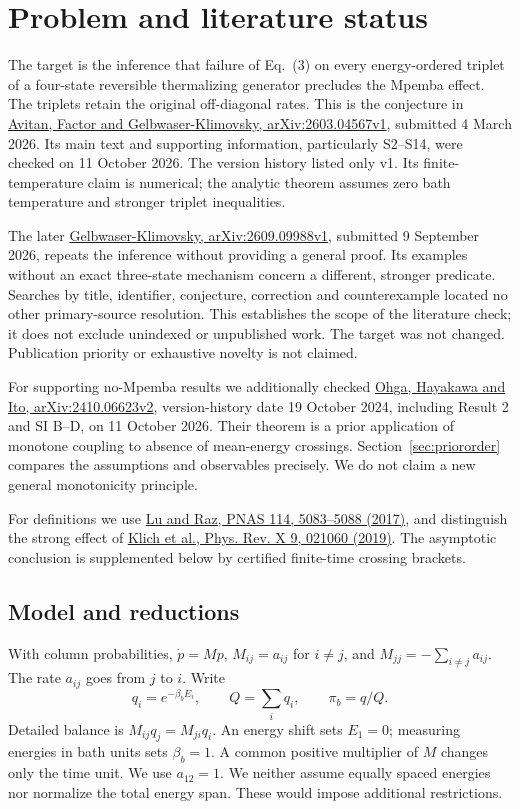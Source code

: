 \documentclass[11pt]{article}
\begin{document}
\section{Problem and literature status}
The target is the inference that failure of Eq.~(3) on every energy-ordered triplet of a four-state reversible thermalizing generator precludes the Mpemba effect. The triplets retain the original off-diagonal rates. This is the conjecture in \href{https://arxiv.org/html/2603.04567v1}{Avitan, Factor and Gelbwaser-Klimovsky, arXiv:2603.04567v1}, submitted 4 March 2026. Its main text and supporting information, particularly S2--S14, were checked on 11 October 2026. The version history listed only v1. Its finite-temperature claim is numerical; the analytic theorem assumes zero bath temperature and stronger triplet inequalities.

The later \href{https://arxiv.org/html/2609.09988v1}{Gelbwaser-Klimovsky, arXiv:2609.09988v1}, submitted 9 September 2026, repeats the inference without providing a general proof. Its examples without an exact three-state mechanism concern a different, stronger predicate. Searches by title, identifier, conjecture, correction and counterexample located no other primary-source resolution. This establishes the scope of the literature check; it does not exclude unindexed or unpublished work. The target was not changed. Publication priority or exhaustive novelty is not claimed.

For supporting no-Mpemba results we additionally checked \href{https://arxiv.org/html/2410.06623v2}{Ohga, Hayakawa and Ito, arXiv:2410.06623v2}, version-history date 19 October 2024, including Result 2 and SI B--D, on 11 October 2026. Their theorem is a prior application of monotone coupling to absence of mean-energy crossings. Section~\ref{sec:priororder} compares the assumptions and observables precisely. We do not claim a new general monotonicity principle.

For definitions we use \href{https://pmc.ncbi.nlm.nih.gov/articles/PMC5441807/}{Lu and Raz, PNAS 114, 5083--5088 (2017)}, and distinguish the strong effect of \href{https://arxiv.org/abs/1711.05829}{Klich et al., Phys. Rev. X 9, 021060 (2019)}. The asymptotic conclusion is supplemented below by certified finite-time crossing brackets.

\subsection{Model and reductions}
With column probabilities, $\dot p=Mp$, $M_{ij}=a_{ij}$ for $i\ne j$, and $M_{jj}=-\sum_{i\ne j}a_{ij}$. The rate $a_{ij}$ goes from $j$ to $i$. Write
\[
q_i=e^{-\beta_b E_i},\qquad Q=\sum_iq_i,\qquad \pi_b=q/Q.
\]
Detailed balance is $M_{ij}q_j=M_{ji}q_i$. An energy shift sets $E_1=0$; measuring energies in bath units sets $\beta_b=1$. A common positive multiplier of $M$ changes only the time unit. We use $a_{12}=1$. We neither assume equally spaced energies nor normalize the total energy span. These would impose additional restrictions.
\end{document}
